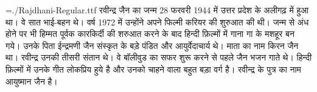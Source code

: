 \pagewidth=210mm
\pageheight=297mm
\hsize=210mm
\hsize=190mm
\hoffset=10mm
\voffset=10mm
\nopagenumbers
\parindent=0mm
\font\raj={./Rajdhani-Regular.ttf}
\raj
रवीन्द्र जैन का जन्म 28 फरवरी 1944 में उत्तर प्रदेश के अलीगढ़ में हुआ था। वे सात भाई-बहन थे। वर्ष 1972 में उन्होंने अपने फिल्मी करियर की शुरुआत की थी। जन्म से अंध होने पर भी हिम्मत पूर्वक कारकिर्दी की शरुआत करने के बाद हिन्दी फ़िल्मों में गाना गा के मशहूर बन गये। उनके पिता ईन्द्रमणी जैन संस्कृत के बड़े पंडित और आयुर्वेदाचार्य थे। माता का नाम किरन जैन था। रवीन्द्र उनकी तीसरी संतान थे। वे बॉलीवुड का सफर शुरू करने से पहले जैन भजन गाते थे। हिन्दी फ़िल्मों में उनके गीत लोकप्रिय हुये है और उनको चाहने वाला बहुत बड़ा वर्ग है। रवीन्द्र के पुत्र का नाम आयुष्मान जैन है।
\bye
